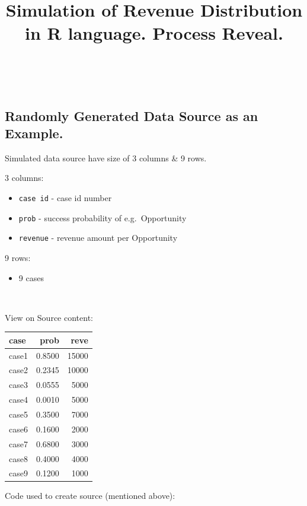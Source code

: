 \documentclass[]{article}
\title{Simulation of Revenue Distribution in R language. Process Reveal.}
\author{}
\date{}
\providecommand{\tightlist}{%
  \setlength{\itemsep}{0pt}\setlength{\parskip}{0pt}}
\begin{document}
\maketitle

{
\setcounter{tocdepth}{2}
\tableofcontents
}
~

\hypertarget{randomly-generated-data-source-as-an-example.}{%
\subsection{Randomly Generated Data Source as an
Example.}\label{randomly-generated-data-source-as-an-example.}}

Simulated data source have size of 3 columns \& 9 rows.

3 columns:

\begin{itemize}
\tightlist
\item
  \texttt{case\ id} - case id number
\item
  \texttt{prob} - success probability of e.g.~Opportunity
\item
  \texttt{revenue} - revenue amount per Opportunity
\end{itemize}

9 rows:

\begin{itemize}
\tightlist
\item
  9 cases
\end{itemize}

~

View on Source content:

\begin{longtable}[]{@{}lrr@{}}
\toprule
case & prob & reve\tabularnewline
\midrule
\endhead
case1 & 0.8500 & 15000\tabularnewline
case2 & 0.2345 & 10000\tabularnewline
case3 & 0.0555 & 5000\tabularnewline
case4 & 0.0010 & 5000\tabularnewline
case5 & 0.3500 & 7000\tabularnewline
case6 & 0.1600 & 2000\tabularnewline
case7 & 0.6800 & 3000\tabularnewline
case8 & 0.4000 & 4000\tabularnewline
case9 & 0.1200 & 1000\tabularnewline
\bottomrule
\end{longtable}

Code used to create source (mentioned above):
\end{document}
